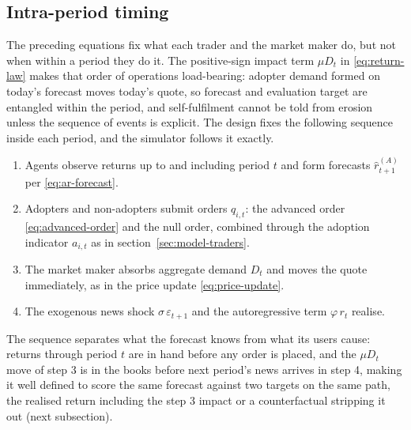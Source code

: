 \documentclass[12pt]{article}
\begin{document}
\subsection{Intra-period timing}\label{sec:model-timing}

The preceding equations fix what each trader and the market maker do, but not when within a period they do it. The positive-sign impact term $\mu D_t$ in \eqref{eq:return-law} makes that order of operations load-bearing: adopter demand formed on today's forecast moves today's quote, so forecast and evaluation target are entangled within the period, and self-fulfilment cannot be told from erosion unless the sequence of events is explicit. The design fixes the following sequence inside each period, and the simulator follows it exactly. %

\begin{enumerate}[itemsep=2pt]
\item Agents observe returns up to and including period $t$ and form forecasts $\hat{r}_{t+1}^{(A)}$ per \eqref{eq:ar-forecast}.
\item Adopters and non-adopters submit orders $q_{i,t}$: the advanced order \eqref{eq:advanced-order} and the null order, combined through the adoption indicator $a_{i,t}$ as in section~\ref{sec:model-traders}.
\item The market maker absorbs aggregate demand $D_t$ and moves the quote immediately, as in the price update \eqref{eq:price-update}.
\item The exogenous news shock $\sigma\,\varepsilon_{t+1}$ and the autoregressive term $\varphi\, r_t$ realise.
\end{enumerate}

The sequence separates what the forecast knows from what its users cause: returns through period $t$ are in hand before any order is placed, and the $\mu D_t$ move of step 3 is in the books before next period's news arrives in step 4, making it well defined to score the same forecast against two targets on the same path, the realised return including the step 3 impact or a counterfactual stripping it out (next subsection). %
\end{document}
